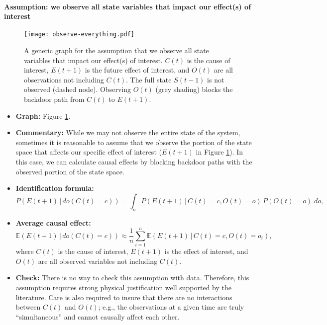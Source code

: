 \documentclass[12pt]{article}
\begin{document}
\paragraph{Assumption: we observe all state variables that impact our effect(s) of interest}

\begin{figure}[H]
  \texttt{[image: observe-everything.pdf]}
  \caption{A generic graph for the assumption that we observe all
    state variables that impact our effect(s) of interest. $C(t)$ is
    the cause of interest, $E(t+1)$ is the future effect of interest,
    and $O(t)$ are all observations not including $C(t)$. The full
    state $S(t-1)$ is not observed (dashed node). Observing $O(t)$
    (grey shading) blocks the backdoor path from $C(t)$ to $E(t+1)$.}
  \label{fig:observe-everything}
\end{figure}

\begin{itemize}
\item \textbf{Graph:} Figure \ref{fig:observe-everything}.
\item \textbf{Commentary:} While we may not observe the entire state
  of the system, sometimes it is reasonable to assume that we observe
  the portion of the state space that affects our specific effect of
  interest ($E(t+1)$ in Figure \ref{fig:observe-everything}). In this
  case, we can calculate causal effects by blocking backdoor paths
  with the observed portion of the state space.
\item \textbf{Identification formula:}
  \begin{equation*}
    P(E(t+1) \, | \, do(C(t) = c)) = \int_{o} P(E(t+1) \, | \, C(t) = c,
    O(t) = o) \, P(O(t)=o) \; d o,
  \end{equation*}
\item \textbf{Average causal effect:}
  \begin{equation*}
    \mathbb{E}(E(t+1) \, | \, do(C(t) = c)) \approx \frac{1}{n}
    \sum_{i=1}^n \mathbb{E}(E(t+1) \, | \, C(t)=c, O(t)=o_i),
  \end{equation*}
  where $C(t)$ is the cause of interest, $E(t+1)$ is the effect of
  interest, and $O(t)$ are all observed variables not including $C(t)$.
\item \textbf{Check:} There is no way to check this assumption with
  data. Therefore, this assumption requires strong physical
  justification well supported by the literature. Care is also
  required to insure that there are no interactions between $C(t)$ and
  $O(t)$; e.g., the observations at a given time are truly
  ``simultaneous'' and cannot causally affect each other.
\end{itemize}
\end{document}
